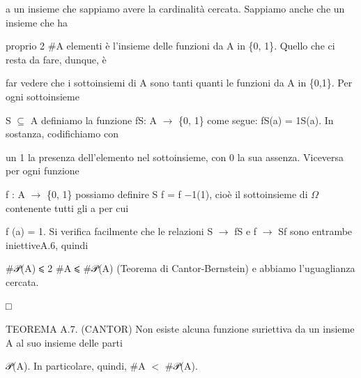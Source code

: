 \documentclass[a4paper,portrait,12pt]{article}
\begin{document}
\begin{flushleft}
a un insieme che sappiamo avere la cardinalit\`{a} cercata. Sappiamo anche che un insieme che ha
\end{flushleft}


\begin{flushleft}
proprio 2 \#A elementi \`{e} l'insieme delle funzioni da A in \{0, 1\}. Quello che ci resta da fare, dunque, \`{e}
\end{flushleft}


\begin{flushleft}
far vedere che i sottoinsiemi di A sono tanti quanti le funzioni da A in \{0,1\}. Per ogni sottoinsieme
\end{flushleft}


\begin{flushleft}
S $\subseteq$ A definiamo la funzione fS: A $\rightarrow$ \{0, 1\} come segue: fS(a) = 1S(a). In sostanza, codifichiamo con
\end{flushleft}


\begin{flushleft}
un 1 la presenza dell'elemento nel sottoinsieme, con 0 la sua assenza. Viceversa per ogni funzione
\end{flushleft}


\begin{flushleft}
f : A $\rightarrow$ \{0, 1\} possiamo definire S f = f $-$1(1), cio\`{e} il sottoinsieme di $\Omega$ contenente tutti gli a per cui
\end{flushleft}


\begin{flushleft}
f (a) = 1. Si verifica facilmente che le relazioni S $\rightarrow$ fS e f $\rightarrow$ Sf sono entrambe iniettiveA.6, quindi
\end{flushleft}


\begin{flushleft}
\#𝒫(A) ⩽ 2 \#A ⩽ \#𝒫(A) (Teorema di Cantor-Bernstein) e abbiamo l'uguaglianza cercata.
\end{flushleft}


□


\begin{flushleft}
TEOREMA A.7. (CANTOR) Non esiste alcuna funzione suriettiva da un insieme A al suo insieme delle parti
\end{flushleft}


\begin{flushleft}
𝒫(A). In particolare, quindi, \#A $<$ \#𝒫(A).
\end{flushleft}
\end{document}
